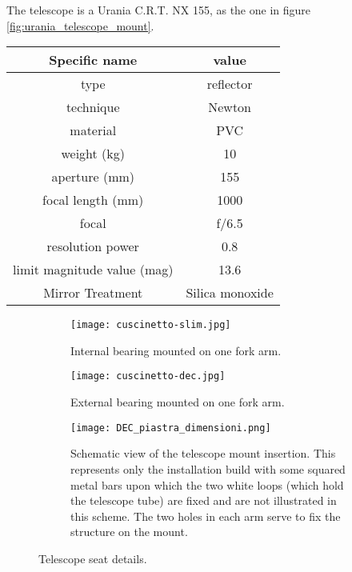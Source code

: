 The telescope is a Urania C.R.T. NX 155, as the one in figure \ref{fig:urania_telescope_mount}.
\\
\begin{minipage}{0.5\textwidth}
    \centering
    \begin{tabular}{c|c}
        Specific name & value \\
        \hline
        type & reflector \\
        technique & Newton  \\
        material & PVC  \\
        weight (kg) & 10 \\
        aperture (mm) & 155 \\
        focal length (mm) & 1000 \\
        focal & f/6.5 \\
        resolution power & 0.8 \\
        limit magnitude value (mag) & 13.6 \\
        Mirror Treatment & Silica monoxide \\
        \hline
    \end{tabular}
\end{minipage}

\begin{figure*}
    \begin{subfigure}[t!]{.23\textwidth}
        \centering
        \texttt{[image: cuscinetto-slim.jpg]}
        \caption{Internal bearing mounted on one fork arm.}
        \label{fig:cuscinetto-slim}
    \end{subfigure}
    \begin{subfigure}[t!]{.23\textwidth}
        \centering
        \texttt{[image: cuscinetto-dec.jpg]}
        \caption{External bearing mounted on one fork arm.}
        \label{fig:cuscinetto-DEC}
    \end{subfigure}
    \begin{subfigure}[t!]
        {0.5\textwidth}
        \centering
        \texttt{[image: DEC\_piastra\_dimensioni.png]}
        \caption{Schematic view of the telescope mount insertion.
        This represents only the installation build with some squared metal bars upon which the two white loops (which hold the telescope tube) are fixed and are not illustrated in this scheme. The two holes in each arm serve to fix the structure on the mount. }
        \label{fig:DEC_piastra_dimensioni}
    \end{subfigure}
    \caption{Telescope seat details.}
    \label{fig:telescope-substitution}
\end{figure*}

